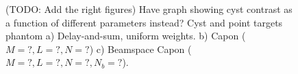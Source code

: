 \documentclass[journal]{IEEEtran}
\begin{document}
\begin{figure}[!t]
\centerline{
\hfil
{}
\hfil
{}}
\caption{(TODO: Add the right figures) Have graph showing cyst contrast as a function of different parameters instead? Cyst and point targets phantom a) Delay-and-sum, uniform weights. b) Capon ($M=?, L=?, N=?$) c) Beamspace Capon ($M=?, L=?, N=?, N_b=?$).}
\label{fig:bench}
\end{figure}
\end{document}

